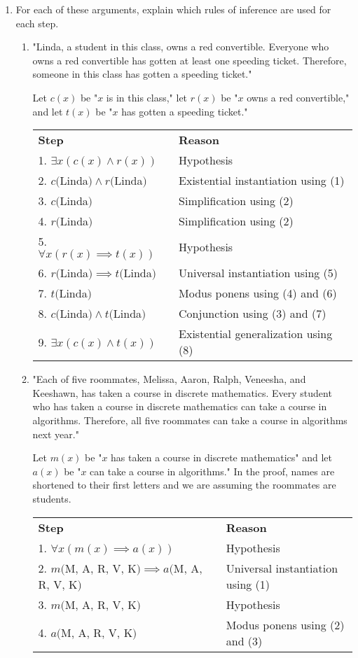 \documentclass[11pt]{article}
\begin{document}
\begin{enumerate}[label=\textbf{\arabic*.}]
	\item For each of these arguments, explain which rules of inference are used for each step.
	\begin{enumerate}[label=\textbf{\alph*)}]
		\item "Linda, a student in this class, owns a red convertible. Everyone who owns a red convertible has gotten at least one speeding ticket. Therefore, someone in this class has gotten a speeding ticket."
		
		Let $c(x)$ be "$x$ is in this class," let $r(x)$ be "$x$ owns a red convertible," and let $t(x)$ be "$x$ has gotten a speeding ticket."
		
		\begin{center}
		\begin{tabular}{ll}
			\textbf{Step} & \textbf{Reason} \\
			1. $\exists x(c(x) \land r(x))$ & Hypothesis \\
			2. $c($Linda$) \land r($Linda$)$ & Existential instantiation using (1) \\
			3. $c($Linda$)$ & Simplification using (2) \\
			4. $r($Linda$)$ & Simplification using (2) \\
			5. $\forall x(r(x) \implies t(x))$ & Hypothesis \\
			6. $r($Linda$) \implies t($Linda$)$ & Universal instantiation using (5) \\
			7. $t($Linda$)$ & Modus ponens using (4) and (6) \\
			8. $c($Linda$) \land t($Linda$)$ & Conjunction using (3) and (7) \\
			9. $\exists x(c(x) \land t(x))$ & Existential generalization using (8)
		\end{tabular}
		\end{center}
		
		\item "Each of five roommates, Melissa, Aaron, Ralph, Veneesha, and Keeshawn, has taken a course in discrete mathematics. Every student who has taken a course in discrete mathematics can take a course in algorithms. Therefore, all five roommates can take a course in algorithms next year."
		
		Let $m(x)$ be "$x$ has taken a course in discrete mathematics" and let $a(x)$ be "$x$ can take a course in algorithms." In the proof, names are shortened to their first letters and we are assuming the roommates are students.
		
		\begin{center}
		\begin{tabular}{ll}
			\textbf{Step} & \textbf{Reason} \\
			1. $\forall x(m(x) \implies a(x))$ & Hypothesis \\
			2. $m($M, A, R, V, K$) \implies a($M, A, R, V, K$)$ & Universal instantiation using (1) \\
			3. $m($M, A, R, V, K$)$ & Hypothesis \\
			4. $a($M, A, R, V, K$)$ & Modus ponens using (2) and (3)
		\end{tabular}
		\end{center}
		

\end{enumerate}
\end{enumerate}
\end{document}
